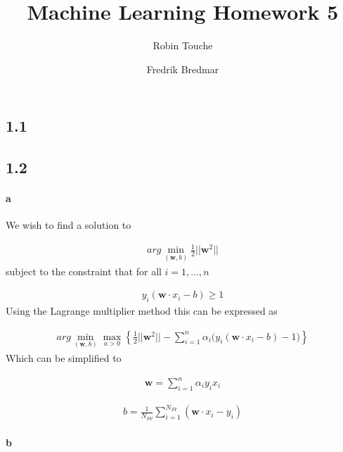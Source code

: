\documentclass{article}
\author{
  Robin Touche \\
  \and
  Fredrik Bredmar
}
\title{Machine Learning Homework 5}
\begin{document}
\maketitle

\subsection*{1.1}

\subsection*{1.2}
\paragraph{a}

We wish to find a solution to

\begin{align}
  arg \min_{(\mathbf{w}, b)} \frac{1}{2} \lvert \rvert \mathbf{w}^2 \lvert \rvert
\end{align}
subject to the constraint that for all $i = 1, ... , n$

\begin{align}
  y_i (\mathbf{w} \cdot x_i - b) \geq 1
\end{align}
Using the Lagrange multiplier method this can be expressed as

\begin{align}
  arg \min_{(\mathbf{w}, b)} \max_{a > 0} \left\{ \frac{1}{2} \lvert \rvert \mathbf{w}^2 \lvert \rvert -
      \sum_{i = 1}^{n}\alpha_i \big( y_i \left( \mathbf{w} \cdot x_i - b \right) - 1 \big) \right\}
\end{align}
Which can be simplified to

\begin{align}
  \mathbf{w} = \sum_{i = 1}^{n}\alpha_i y_i x_i
\end{align}


\begin{align}
  b = \frac{1}{N_{SV}} \sum_{i = 1}^{N_{SV}} \left( \mathbf{w} \cdot x_i - y_i \right)
\end{align}

\paragraph{b}
\end{document}
